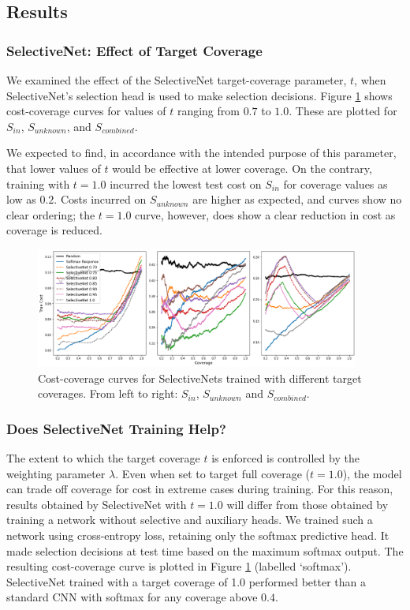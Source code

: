 \subsection{Results}
\subsubsection{SelectiveNet: Effect of Target Coverage}
We examined the effect of the SelectiveNet target-coverage parameter, $t$, when SelectiveNet's selection head is used to make selection decisions. Figure \ref{fig:sn_coverage} shows cost-coverage curves for values of $t$ ranging from $0.7$ to $1.0$. These are plotted for $S_{in}$, $S_{unknown}$, and $S_{combined}$. 

We expected to find, in accordance with the intended purpose of this parameter, that lower values of $t$ would be effective at lower coverage. On the contrary, training with $t=1.0$ incurred the lowest test cost on $S_{in}$ for coverage values as low as $0.2$. Costs incurred on $S_{unknown}$ are higher as expected, and curves show no clear ordering; the $t=1.0$ curve, however, does show a clear reduction in cost as coverage is reduced.

\begin{figure}[h]
	\centering
	\includegraphics[width=0.95\textwidth]{images/selectivenet_v2.png}
	\caption{Cost-coverage curves for SelectiveNets trained with different target coverages. From left to right: \(S_{in}\), \(S_{unknown}\) and  \(S_{combined}\).}
	\label{fig:sn_coverage}
\end{figure}

\subsubsection{Does SelectiveNet Training Help?}
The extent to which the target coverage $t$ is enforced is controlled by the weighting parameter $\lambda$. Even when set to target full coverage ($t=1.0$), the model can trade off coverage for cost in extreme cases during training. For this reason, results obtained by SelectiveNet with $t=1.0$ will differ from those obtained by training a network without selective and auxiliary heads. We trained such a network using cross-entropy loss, retaining only the softmax predictive head. It made selection decisions at test time based on the maximum softmax output. The resulting cost-coverage curve is plotted in Figure \ref{fig:sn_coverage} (labelled `softmax'). SelectiveNet trained with a target coverage of 1.0 performed better than a standard CNN with softmax for any coverage above $0.4$.

